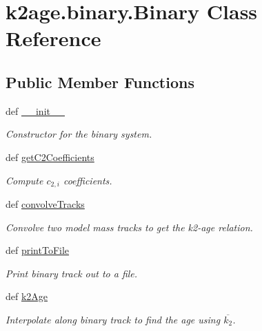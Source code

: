 \hypertarget{classk2age_1_1binary_1_1Binary}{\section{k2age.\-binary.\-Binary \-Class \-Reference}
\label{classk2age_1_1binary_1_1Binary}
}
\subsection*{\-Public \-Member \-Functions}
\begin{DoxyCompactItemize}
\item 
def \hyperlink{classk2age_1_1binary_1_1Binary_a02b8c0a887d97834d084c965b5421496}{\-\_\-\-\_\-init\-\_\-\-\_\-}
\begin{DoxyCompactList}\small\item\em \-Constructor for the binary system. \end{DoxyCompactList}\item 
def \hyperlink{classk2age_1_1binary_1_1Binary_a134f4bbf0ffa3432e4dadf34116897ce}{get\-C2\-Coefficients}
\begin{DoxyCompactList}\small\item\em \-Compute $c_{2, i}$ coefficients. \end{DoxyCompactList}\item 
def \hyperlink{classk2age_1_1binary_1_1Binary_a3756d0a6b68a645774cf85e6d14e54df}{convolve\-Tracks}
\begin{DoxyCompactList}\small\item\em \-Convolve two model mass tracks to get the k2-\/age relation. \end{DoxyCompactList}\item 
def \hyperlink{classk2age_1_1binary_1_1Binary_a3ce3165a5b62825d0ef2c1861cc72e06}{print\-To\-File}
\begin{DoxyCompactList}\small\item\em \-Print binary track out to a file. \end{DoxyCompactList}\item 
def \hyperlink{classk2age_1_1binary_1_1Binary_ae83f12308c020ad481a2b1736e74577a}{k2\-Age}
\begin{DoxyCompactList}\small\item\em \-Interpolate along binary track to find the age using $\overline{k_{2}}$. \end{DoxyCompactList}\end{DoxyCompactItemize}
